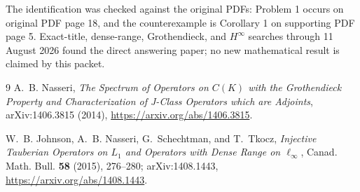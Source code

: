\documentclass[11pt]{article}
\begin{document}
The identification was checked against the original PDFs: Problem 1 occurs
on original PDF page 18, and the counterexample is Corollary 1 on supporting
PDF page 5.  Exact-title, dense-range, Grothendieck, and $H^\infty$ searches
through 11 August 2026 found the direct answering paper; no new mathematical
result is claimed by this packet.

\begin{thebibliography}{9}
A.~B. Nasseri,
\emph{The Spectrum of Operators on $C(K)$ with the Grothendieck Property and
Characterization of J-Class Operators which are Adjoints},
arXiv:1406.3815 (2014),
\url{https://arxiv.org/abs/1406.3815}.

W.~B. Johnson, A.~B. Nasseri, G.~Schechtman, and T.~Tkocz,
\emph{Injective Tauberian Operators on $L_1$ and Operators with Dense Range
on $\ell_\infty$},
Canad. Math. Bull. \textbf{58} (2015), 276--280;
arXiv:1408.1443,
\url{https://arxiv.org/abs/1408.1443}.
\end{thebibliography}
\end{document}
